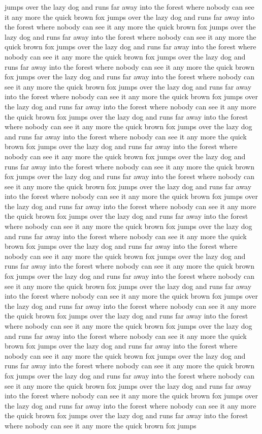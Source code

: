 \documentclass{article}
\begin{document}
jumps over the lazy dog and runs far away into the forest where nobody can see it any more the quick brown fox jumps over the lazy dog and runs far away into the forest where nobody can see it any more the quick brown fox jumps over the lazy dog and runs far away into the forest where nobody can see it any more the quick brown fox jumps over the lazy dog and runs far away into the forest where nobody can see it any more the quick brown fox jumps over the lazy dog and runs far away into the forest where nobody can see it any more the quick brown fox jumps over the lazy dog and runs far away into the forest where nobody can see it any more the quick brown fox jumps over the lazy dog and runs far away into the forest where nobody can see it any more the quick brown fox jumps over the lazy dog and runs far away into the forest where nobody can see it any more the quick brown fox jumps over the lazy dog and runs far away into the forest where nobody can see it any more the quick brown fox jumps over the lazy dog and runs far away into the forest where nobody can see it any more the quick brown fox jumps over the lazy dog and runs far away into the forest where nobody can see it any more the quick brown fox jumps over the lazy dog and runs far away into the forest where nobody can see it any more the quick brown fox jumps over the lazy dog and runs far away into the forest where nobody can see it any more the quick brown fox jumps over the lazy dog and runs far away into the forest where nobody can see it any more the quick brown fox jumps over the lazy dog and runs far away into the forest where nobody can see it any more the quick brown fox jumps over the lazy dog and runs far away into the forest where nobody can see it any more the quick brown fox jumps over the lazy dog and runs far away into the forest where nobody can see it any more the quick brown fox jumps over the lazy dog and runs far away into the forest where nobody can see it any more the quick brown fox jumps over the lazy dog and runs far away into the forest where nobody can see it any more the quick brown fox jumps over the lazy dog and runs far away into the forest where nobody can see it any more the quick brown fox jumps over the lazy dog and runs far away into the forest where nobody can see it any more the quick brown fox jumps over the lazy dog and runs far away into the forest where nobody can see it any more the quick brown fox jumps over the lazy dog and runs far away into the forest where nobody can see it any more the quick brown fox jumps over the lazy dog and runs far away into the forest where nobody can see it any more the quick brown fox jumps over the lazy dog and runs far away into the forest where nobody can see it any more the quick brown fox jumps over the lazy dog and runs far away into the forest where nobody can see it any more the quick brown fox jumps over the lazy dog and runs far away into the forest where nobody can see it any more the quick brown fox jumps over the lazy dog and runs far away into the forest where nobody can see it any more the quick brown fox jumps over the lazy dog and runs far away into the forest where nobody can see it any more the quick brown fox jumps over the lazy dog and runs far away into the forest where nobody can see it any more the quick brown fox jumps 
\end{document}
